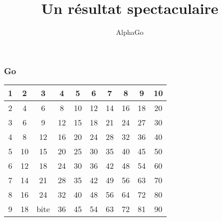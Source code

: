 \documentclass{formation}
\title{Un résultat spectaculaire}
\subtitle{AlphaGo}
\begin{document}
\maketitle

\begin{frame}
  \frametitle{Go}
  \begin{tabular}{|*{10}{c|}}
    \hline
    1  & 2  & 3  & 4  & 5  & 6  & 7  & 8  & 9  & 10 \\
    \hline
    2  & 4  & 6  & 8  & 10 & 12 & 14 & 16 & 18 & 20 \\
    \hline
    3  & 6  & 9  & 12 & 15 & 18 & 21 & 24 & 27 & 30 \\
    \hline
    4  & 8  & 12 & 16 & 20 & 24 & 28 & 32 & 36 & 40 \\
    \hline
    5  & 10 & 15 & 20 & 25 & 30 & 35 & 40 & 45 & 50 \\
    \hline
    6  & 12 & 18 & 24 & 30 & 36 & 42 & 48 & 54 & 60 \\
    \hline
    7  & 14 & 21 & 28 & 35 & 42 & 49 & 56 & 63 & 70 \\
    \hline
    8  & 16 & 24 & 32 & 40 & 48 & 56 & 64 & 72 & 80 \\
    \hline
    9  & 18 & bite & 36 & 45 & 54 & 63 & 72 & 81 & 90 \\
    \hline
  \end{tabular}
\end{frame}
\end{document}
